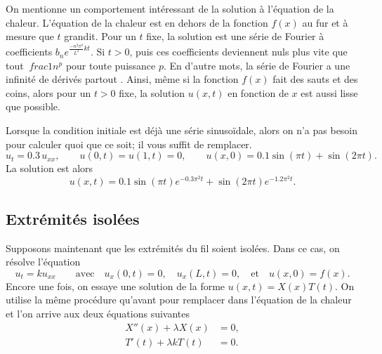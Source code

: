 On mentionne un comportement intéressant de la solution à l'équation de la chaleur.
L'équation de la chaleur est
 en dehors de la fonction $ f (x) $ au fur et à mesure que $ t $ grandit.  Pour un $ t $ fixe,
la solution est une série de Fourier à coefficients
$b_n e^{\frac{-n^2 \pi^2}{L^2} k t}$.  Si $t > 0$,  puis ces coefficients
deviennent nuls plus vite que tout $ \ frac {1} {n ^ p} $ pour toute puissance $ p $.  En d'autre
mots,  la série de Fourier a une infinité de dérivés partout .
Ainsi,  même si la fonction $ f (x) $ fait des sauts et des coins,  alors pour
un  $ t> 0 $ fixe,  la solution
$ u (x, t) $ en fonction de $ x $ est aussi lisse que possible.

\begin{example}
Lorsque la condition initiale est déjà une série sinusoïdale,  alors on n'a pas besoin
pour calculer quoi que ce soit; il vous suffit de remplacer.
\begin{equation*}
u_t = 0.3 \, u_{xx}, \qquad u(0,t)=u(1,t)=0, \qquad u(x,0) = 0.1 \sin(\pi t) +
\sin(2\pi t) .
\end{equation*}
La solution est alors
\begin{equation*}
u(x,t) =
0.1 \sin(\pi t) e^{- 0.3 \pi^2 t}
+ 
\sin(2 \pi t) e^{- 1.2 \pi^2 t} .
\end{equation*}
\end{example}

\subsection{Extrémités isolées}

Supposons maintenant que les extrémités du fil soient isolées.  Dans ce cas,  on résolve
l'équation
\begin{equation*}
u_t = k u_{xx}
\qquad \text{avec} \quad
u_x(0,t) = 0, \quad u_x(L,t) = 0,
\quad \text{et} \quad u(x,0) = f(x) .
\end{equation*}
Encore une fois,  on essaye une solution de la forme $ u (x, t) = X (x) T (t) $.  On utilise la même
procédure qu'avant pour remplacer dans l'équation de la chaleur et l'on arrive aux
deux équations suivantes
\begin{align*}
X''(x) + \lambda X(x) &= 0 , \\
T'(t) + \lambda k T(t) &= 0 .
\end{align*}

